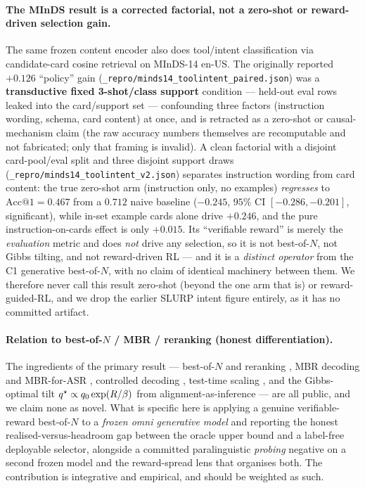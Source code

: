 \paragraph{The MInDS result is a corrected factorial, not a zero-shot or reward-driven selection gain.}
The same frozen content encoder also does tool/intent classification via candidate-card cosine
retrieval on MInDS-14 en-US. The originally reported $+0.126$ ``policy'' gain
(\texttt{\_repro/minds14\_toolintent\_paired.json}) was a \textbf{transductive fixed 3-shot/class
support} condition --- held-out eval rows leaked into the card/support set --- confounding three factors
(instruction wording, schema, card content) at once, and is retracted as a zero-shot or causal-mechanism
claim (the raw accuracy numbers themselves are recomputable and not fabricated; only that framing is
invalid). A clean factorial with a disjoint card-pool/eval split and three disjoint support draws
(\texttt{\_repro/minds14\_toolintent\_v2.json}) separates instruction wording from card content: the
true zero-shot arm (instruction only, no examples) \emph{regresses} to $\mathrm{Acc@1}=0.467$ from a
$0.712$ naive baseline ($-0.245$, $95\%$ CI $[-0.286,-0.201]$, significant), while in-set example cards
alone drive $+0.246$, and the pure instruction-on-cards effect is only $+0.015$. Its ``verifiable
reward'' is merely the \emph{evaluation} metric and does \emph{not} drive any selection, so it is not
best-of-$N$, not Gibbs tilting, and not reward-driven RL --- and it is a \emph{distinct operator} from
the C1 generative best-of-$N$, with no claim of identical machinery between them. We therefore never
call this result zero-shot (beyond the one arm that is) or reward-guided-RL, and we drop the earlier
SLURP intent figure entirely, as it has no committed artifact.

\paragraph{Relation to best-of-$N$ / MBR / reranking (honest differentiation).}
The ingredients of the primary result --- best-of-$N$ and reranking
\citep{beirami2024bon,verdun2025softbon,gui2024bonbon}, MBR decoding and MBR-for-ASR
\citep{jinnai2024mbrbon,ichihara2025mbr,mbrasr2025}, controlled decoding
\citep{mudgal2024controlled}, test-time scaling \citep{snell2024ttscompute}, and the Gibbs-optimal
tilt $q^{\star}\propto q_{0}\exp(R/\beta)$ from alignment-as-inference
\citep{korbak2022kl,yang2024asymptotics} --- are all public, and we claim none as novel. What is
specific here is applying a genuine verifiable-reward best-of-$N$ to a \emph{frozen omni generative
model} and reporting the honest realised-versus-headroom gap between the oracle upper bound and a
label-free deployable selector, alongside a committed paralinguistic \emph{probing} negative on a
second frozen model and the reward-spread lens that organises both. The contribution is integrative and
empirical, and should be weighted as such.

